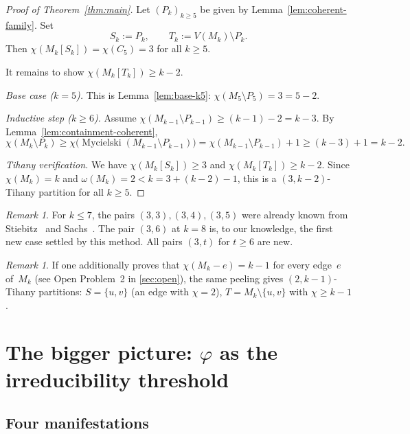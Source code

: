 \documentclass[11pt,a4paper]{amsart}
\theoremstyle{plain}
\theoremstyle{definition}
\theoremstyle{remark}
\newtheorem{remark}[theorem]{Remark}
\newcommand{\vp}{\varphi}
\newcommand{\myc}{\operatorname{Mycielski}}
\newcommand{\chr}{\chi}
\newcommand{\om}{\omega}
\begin{document}
\begin{proof}[Proof of Theorem~\ref{thm:main}]
Let $(P_k)_{k\ge 5}$ be given by Lemma~\ref{lem:coherent-family}. Set
\[
S_k:=P_k,\qquad T_k:=V(M_k)\setminus P_k.
\]
Then $\chr(M_k[S_k])=\chr(C_5)=3$ for all $k\ge 5$.

It remains to show $\chr(M_k[T_k])\ge k-2$.

\medskip\noindent
\emph{Base case ($k=5$).}
This is Lemma~\ref{lem:base-k5}: $\chr(M_5\setminus P_5)=3=5-2$.

\medskip\noindent
\emph{Inductive step ($k \geq 6$).}
Assume $\chr(M_{k-1}\setminus P_{k-1})\ge (k-1)-2=k-3$.
By Lemma~\ref{lem:containment-coherent},
\[
\chr(M_k\setminus P_k)
\ge \chr\!\bigl(\myc(M_{k-1}\setminus P_{k-1})\bigr)
= \chr(M_{k-1}\setminus P_{k-1})+1
\ge (k-3)+1
= k-2.
\]

\medskip\noindent
\emph{Tihany verification.}
We have $\chr(M_k[S_k])\ge 3$ and $\chr(M_k[T_k])\ge k-2$.
Since $\chr(M_k)=k$ and $\om(M_k)=2<k=3+(k-2)-1$, this is a
$(3,k-2)$-Tihany partition for all $k\ge 5$.
\end{proof}

\begin{remark}\label{rem:prior-cases}
For $k \leq 7$, the pairs $(3,3),(3,4),(3,5)$ were already known from
Stiebitz~\cite{stiebitz1987} and Sachs~\cite{sachs1993}.  The pair $(3,6)$ at
$k = 8$ is, to our knowledge, the first new case settled by this method.  All
pairs $(3,t)$ for $t\geq 6$ are new.
\end{remark}

\begin{remark}\label{rem:edge-crit}
If one additionally proves that $\chr(M_k - e) = k - 1$ for every edge~$e$
of~$M_k$ (see Open Problem~2 in \cref{sec:open}), the same peeling gives
$(2,k{-}1)$-Tihany partitions: $S = \{u,v\}$ (an edge with $\chr = 2$),
$T = M_k\setminus\{u,v\}$ with $\chr \geq k-1$.
\end{remark}

\section{The bigger picture: \texorpdfstring{$\vp$}{φ} as the irreducibility
threshold}\label{sec:bigger}

\subsection{Four manifestations}
\end{document}

